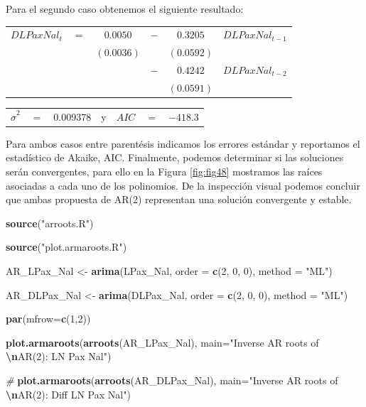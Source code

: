 \documentclass[
]{book}
\newenvironment{Shaded}{\begin{snugshade}}{\end{snugshade}}
\newcommand{\AttributeTok}[1]{\textcolor[rgb]{0.13,0.29,0.53}{#1}}
\newcommand{\CommentTok}[1]{\textcolor[rgb]{0.56,0.35,0.01}{\textit{#1}}}
\newcommand{\DecValTok}[1]{\textcolor[rgb]{0.00,0.00,0.81}{#1}}
\newcommand{\FunctionTok}[1]{\textcolor[rgb]{0.13,0.29,0.53}{\textbf{#1}}}
\newcommand{\NormalTok}[1]{#1}
\newcommand{\OtherTok}[1]{\textcolor[rgb]{0.56,0.35,0.01}{#1}}
\newcommand{\SpecialCharTok}[1]{\textcolor[rgb]{0.81,0.36,0.00}{\textbf{#1}}}
\newcommand{\StringTok}[1]{\textcolor[rgb]{0.31,0.60,0.02}{#1}}
\begin{document}
Para el segundo caso obtenemos el siguiente resultado:

\begin{center}
\begin{tabular}{ c c c c c c } 
    $DLPaxNal_t$ & $=$ & $0.0050$ & $-$ & $0.3205$  & $DLPaxNal_{t-1}$ \\ 
    &  & $(0.0036)$ &  & $(0.0592)$ & \\
    &  &  & $-$ & $0.4242$ & $DLPaxNal_{t-2}$ \\
    &  &  &  & $(0.0591)$ &
\end{tabular}
\end{center}

\begin{center}
\begin{tabular}{ c c c c c c c } 
    $\hat{\sigma}^2$ & $=$ & $0.009378$ & y & $AIC$ & $=$ & $-418.3$ 
\end{tabular}
\end{center}

Para ambos casos entre parentésis indicamos los errores estándar y reportamos el estadístico de Akaike, AIC. Finalmente, podemos determinar si las soluciones serán convergentes, para ello en la Figura \ref{fig:fig48} mostramos las raíces asociadas a cada uno de los polinomios. De la inspección visual podemos concluir que ambas propuesta de AR(2) representan una solución convergente y estable.

\begin{Shaded}
\begin{Highlighting}[]
\FunctionTok{source}\NormalTok{(}\StringTok{"arroots.R"}\NormalTok{)}

\FunctionTok{source}\NormalTok{(}\StringTok{"plot.armaroots.R"}\NormalTok{)}

\NormalTok{AR\_LPax\_Nal }\OtherTok{\textless{}{-}} \FunctionTok{arima}\NormalTok{(LPax\_Nal, }\AttributeTok{order =} \FunctionTok{c}\NormalTok{(}\DecValTok{2}\NormalTok{, }\DecValTok{0}\NormalTok{, }\DecValTok{0}\NormalTok{), }
                     \AttributeTok{method =} \StringTok{"ML"}\NormalTok{)}

\NormalTok{AR\_DLPax\_Nal }\OtherTok{\textless{}{-}} \FunctionTok{arima}\NormalTok{(DLPax\_Nal, }\AttributeTok{order =} \FunctionTok{c}\NormalTok{(}\DecValTok{2}\NormalTok{, }\DecValTok{0}\NormalTok{, }\DecValTok{0}\NormalTok{), }
                      \AttributeTok{method =} \StringTok{"ML"}\NormalTok{)}

\FunctionTok{par}\NormalTok{(}\AttributeTok{mfrow=}\FunctionTok{c}\NormalTok{(}\DecValTok{1}\NormalTok{,}\DecValTok{2}\NormalTok{))}

\FunctionTok{plot.armaroots}\NormalTok{(}\FunctionTok{arroots}\NormalTok{(AR\_LPax\_Nal), }
               \AttributeTok{main=}\StringTok{"Inverse AR roots of }\SpecialCharTok{\textbackslash{}n}\StringTok{AR(2): LN Pax Nal"}\NormalTok{)}

\CommentTok{\#}
\FunctionTok{plot.armaroots}\NormalTok{(}\FunctionTok{arroots}\NormalTok{(AR\_DLPax\_Nal), }
               \AttributeTok{main=}\StringTok{"Inverse AR roots of }\SpecialCharTok{\textbackslash{}n}\StringTok{AR(2): Diff LN Pax Nal"}\NormalTok{)}
\end{Highlighting}
\end{Shaded}
\end{document}
